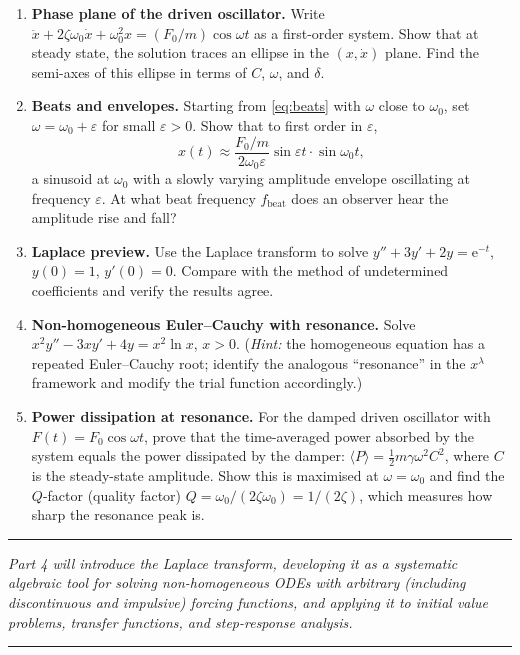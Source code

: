 \documentclass[12pt,a4paper]{article}
\newcommand{\ee}{\mathrm{e}}
\begin{document}
\begin{enumerate}[label=\textbf{\arabic*.}, leftmargin=*, start=12]

\item \textbf{Phase plane of the driven oscillator.} Write $\ddot x + 2\zeta\omega_0\dot x
  + \omega_0^2 x = (F_0/m)\cos\omega t$ as a first-order system. Show that at steady
  state, the solution traces an ellipse in the $(x, \dot x)$ plane. Find the semi-axes
  of this ellipse in terms of $C$, $\omega$, and $\delta$.

\item \textbf{Beats and envelopes.} Starting from \eqref{eq:beats} with $\omega$ close to
  $\omega_0$, set $\omega = \omega_0 + \varepsilon$ for small $\varepsilon > 0$. Show that
  to first order in $\varepsilon$,
  \[
    x(t) \approx \frac{F_0/m}{2\omega_0\varepsilon}\sin\varepsilon t\cdot\sin\omega_0 t,
  \]
  a sinusoid at $\omega_0$ with a slowly varying amplitude envelope oscillating at
  frequency $\varepsilon$. At what beat frequency $f_\mathrm{beat}$ does an observer
  hear the amplitude rise and fall?

\item \textbf{Laplace preview.} Use the Laplace transform to solve
  $y'' + 3y' + 2y = \ee^{-t}$, $y(0)=1$, $y'(0)=0$. Compare with the method of
  undetermined coefficients and verify the results agree.

\item \textbf{Non-homogeneous Euler--Cauchy with resonance.} Solve
  $x^2 y'' - 3xy' + 4y = x^2\ln x$, $x > 0$.
  (\textit{Hint:} the homogeneous equation has a repeated Euler--Cauchy root; identify
  the analogous ``resonance'' in the $x^\lambda$ framework and modify the trial function
  accordingly.)

\item \textbf{Power dissipation at resonance.} For the damped driven oscillator with
  $F(t) = F_0\cos\omega t$, prove that the time-averaged power absorbed by the system
  equals the power dissipated by the damper:
  $\langle P\rangle = \tfrac{1}{2}m\gamma\omega^2 C^2$, where $C$ is the
  steady-state amplitude. Show this is maximised at $\omega = \omega_0$ and find the
  $Q$-factor (quality factor) $Q = \omega_0/(2\zeta\omega_0) = 1/(2\zeta)$, which measures
  how sharp the resonance peak is.

\end{enumerate}

\vspace{1.5em}
{\color{deepblue}\rule{\linewidth}{0.8pt}}
\begin{center}
\small\itshape
Part 4 will introduce the Laplace transform, developing it as a systematic algebraic tool for solving
non-homogeneous ODEs with arbitrary (including discontinuous and impulsive) forcing functions,
and applying it to initial value problems, transfer functions, and step-response analysis.
\end{center}
{\color{deepblue}\rule{\linewidth}{0.8pt}}
\end{document}
